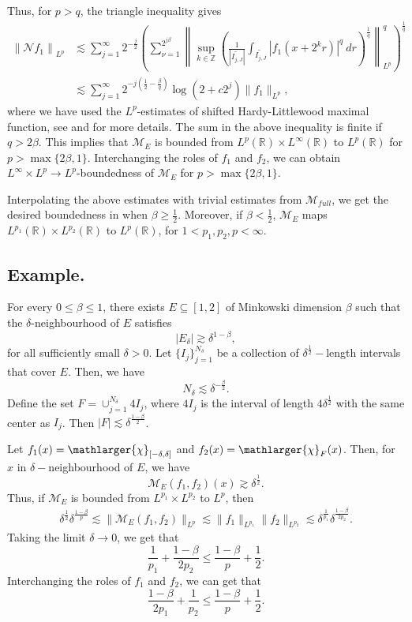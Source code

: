 \documentclass[a4paper,reqno]{amsart}
\numberwithin{equation}{section}
\newcommand{\R}{{\mathbb {R}}}
\begin{document}
	Thus, for $p>q$, the triangle inequality gives
	\begin{align*}
		\left\|\mathcal{N}f_1\right\|_{L^p}
		&\lesssim\sum_{j=1}^{\infty}2^{-\frac{j}{2}}\left(\sum_{\nu=1}^{2^{j\beta}}\left\|\sup_{k\in \mathbb{Z}}\left(\frac{1}{|\widetilde{I_{j,J}}|}\int_{\widetilde{I_{j,J}}}|f_1(x+2^kr)|^q~dr\right)^\frac{1}{q}\right\|_{L^p}^q\right)^{\frac{1}{q}}\\
		&\lesssim\sum_{j=1}^{\infty}2^{-j\left(\frac{1}{2}-\frac{\beta}{q}\right)}\log(2+c2^{j})\|f_1\|_{L^p},
	\end{align*}
	where we have used the $L^p$-estimates of shifted Hardy-Littlewood maximal function, see \cite[Theorem 4.1]{Muscalu} and \cite{book-Stein} for more details. The sum in the above inequality is finite if $q>2\beta$. This implies that $\mathcal{M}_E$ is bounded from $L^{p}(\R)\times L^{\infty}(\R)$ to $L^{p}(\R)$ for $p>\max\{2\beta,1\}$. Interchanging the roles of $f_1$ and $f_2$, we can obtain $L^{\infty}\times L^{p}\to L^{p}$-boundedness of $\mathcal{M}_E$ for $p>\max\{2\beta,1\}$.
	
	Interpolating the above estimates with trivial estimates from $\mathcal{M}_{full}$, we get the desired boundedness in  when $\beta\geq\frac{1}{2}$. Moreover, if $\beta<\frac{1}{2}$, $\mathcal{M}_E$ maps $L^{p_1}(\R)\times L^{p_2}(\R)$ to $L^{p}(\R)$, for $1<p_1,p_2,p<\infty$.
	
	\subsection{Example.} For every $0\le\beta\le1$, there exists $E\subseteq [1,2]$ of Minkowski dimension $\beta$ such that the $\delta$-neighbourhood of $E$ satisfies
	\[|E_\delta|\gtrsim \delta^{1-\beta},\]
	for all sufficiently small $\delta>0$. Let $\{I_j\}_{j=1}^{N_\delta}$ be a collection of $\delta^{\frac{1}{2}}-$length intervals that cover $E$. Then, we have
	\[N_\delta\lesssim\delta^{-\frac{\beta}{2}}.\]
	Define the set $F=\cup_{j=1}^{N_\delta}4I_j$, where $4I_j$ is the interval of length $4\delta^{\frac{1}{2}}$ with the same center as $I_j$. Then $|F|\lesssim\delta^{\frac{1-\beta}{2}}$.
	
	Let $f_1(x)=\mathlarger{\chi}_{[-\delta,\delta]}$ and $f_2(x)=\mathlarger{\chi}_{F}(x)$. Then, for $x$ in $\delta-$neighbourhood of $E$, we have
	\[\mathcal{M}_E(f_1,f_2)(x)\gtrsim\delta^{\frac{1}{2}}.\]
	Thus, if $\mathcal{M}_E$ is bounded from $L^{p_1}\times L^{p_2}$ to $L^{p}$, then
	\begin{align*}
		\delta^{\frac{1}{2}}\delta^{\frac{1-\beta}{p}}\lesssim\|\mathcal{M}_E(f_1,f_2)\|_{L^p}\lesssim\|f_1\|_{L^{p_1}}\|f_2\|_{L^{p_2}}\lesssim\delta^{\frac{1}{p_1}}\delta^{\frac{1-\beta}{2p_2}}.
	\end{align*}
	Taking the limit $\delta\to 0$, we get that
	\[\frac{1}{p_1}+\frac{1-\beta}{2p_2}\leq\frac{1-\beta}{p}+\frac{1}{2}.\]
	Interchanging the roles of $f_1$ and $f_2$, we can get that
	\[\frac{1-\beta}{2p_1}+\frac{1}{p_2}\leq\frac{1-\beta}{p}+\frac{1}{2}.\]
	
\end{document}
